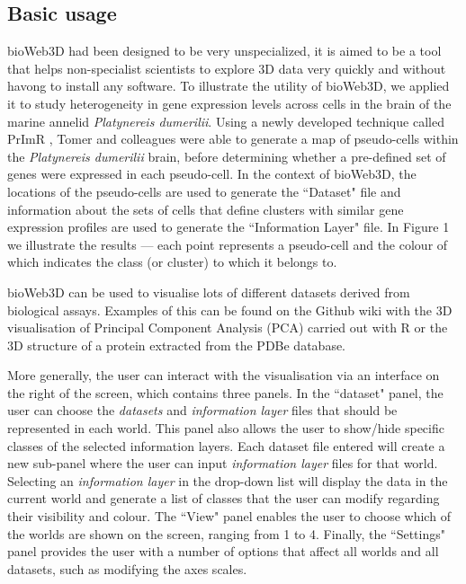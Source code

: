 \documentclass[10pt]{bmc_article}
\newenvironment{bmcformat}{\baselineskip20pt\sloppy\setboolean{publ}{false}}{\baselineskip20pt\sloppy}
\begin{document}
\begin{bmcformat}
	\subsection{Basic usage}
	bioWeb3D had been designed to be very unspecialized, it is aimed to be a tool that helps non-specialist scientists to explore 3D data very quickly and without havong to install any software.
	To illustrate the utility of bioWeb3D, we applied it to study heterogeneity in gene expression levels across cells in the brain of the marine annelid {\it{Platynereis dumerilii}}. Using a newly developed technique called PrImR \cite{Tomer10}, Tomer and colleagues were able to generate a map of pseudo-cells within the {\it{Platynereis dumerilii}} brain, before determining whether a pre-defined set of genes were expressed in each pseudo-cell. In the context of bioWeb3D, the locations of the pseudo-cells are used to generate the ``Dataset" file and information about the sets of cells that define clusters with similar gene expression profiles are used to generate the ``Information Layer" file. In Figure 1 we illustrate the results ---  each point represents a pseudo-cell and the colour of which indicates the class (or cluster) to which it belongs to. 

	bioWeb3D can be used to visualise lots of different datasets derived from biological assays. Examples of this can be found on the Github wiki \cite{github} with the 3D visualisation of Principal Component Analysis (PCA) carried out with R or the 3D structure of a protein extracted from the PDBe database.
	
	More generally, the user can interact with the visualisation via an interface on the right of the screen, which contains three panels. In the ``dataset" panel, the user can choose the {\it{datasets}} and {\it{information layer}} files that should be represented in each world. This panel also allows the user to show/hide specific classes of the selected information layers. Each dataset file entered will create a new sub-panel where the user can input {\it{information layer}} files for that world. Selecting an {\it{information layer}} in the drop-down list will display the data in the current world and generate a list of classes that the user can modify regarding their visibility and colour. The ``View" panel enables the user to choose which of the worlds are shown on the screen, ranging from 1 to 4. Finally, the ``Settings" panel provides the user with a number of options that affect all worlds and all datasets, such as modifying the axes scales.


\end{bmcformat}
\end{document}
